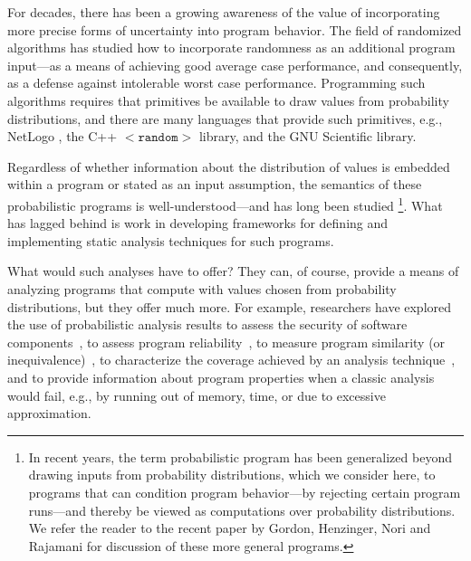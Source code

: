 For decades, there has been a growing awareness of the value of 
incorporating more precise forms of uncertainty into program behavior.  
The field of randomized algorithms has studied how to incorporate
randomness as an additional program input---as a means of achieving
good average case performance, and consequently, as a defense against
intolerable worst case performance.
Programming such algorithms requires that primitives be available
to draw values from probability distributions, and there are many
languages that provide such primitives, e.g., NetLogo \cite{tisue2004netlogo},
the C++ \texttt{$\mathtt{<random>}$} library, and the GNU Scientific library.

Regardless of whether information about the distribution of
values is embedded within a program or stated as an input assumption,
the semantics of these probabilistic programs is well-understood---and
has long been studied 
\cite{kozen1981semantics,kozen1983probabilistic,jones1990probabilistic,morgan1996probabilistic}
\setcounter{footnote}{0}
\footnote{In recent
years, the term probabilistic program has been generalized beyond
drawing inputs from probability distributions, which we
consider here, to programs that can condition program behavior---by
rejecting certain program runs---and thereby be viewed as
computations over probability distributions.  We refer the reader to the
recent paper by Gordon, Henzinger, Nori and Rajamani \cite{Gordon2014}
for discussion of these more general programs.}. 
What has lagged behind is work in developing frameworks for 
defining and implementing static analysis techniques for such programs.

What would such analyses have to offer?
They can, of course, provide a means of analyzing programs that compute
with values chosen from probability distributions, but they offer much
more.
For example, researchers have explored the use of probabilistic analysis
results to assess the security of software components~\cite{mardziel2013dynamic},
to assess program reliability~\cite{Filieri2013}, to measure program
similarity (or inequivalence)~\cite{Geldenhuys2012}, 
to characterize the coverage
achieved by an analysis technique~\cite{DwyerASE11}, and to provide information
about program properties when a classic analysis would fail, e.g.,
by running out of memory, time, or due to excessive approximation.

